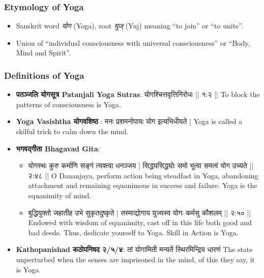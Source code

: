 \begin{frame}[fragile]\frametitle{Etymology of Yoga}

      \begin{itemize}
	
		\item Sanskrit word \textit{योग} (Yoga), root \textit{युज्} (Yuj) meaning “to join” or “to unite”.
		\item Union of ``individual consciousness with universal consciousness'' or ``Body, Mind and Spirit''.
	  \end{itemize}

\end{frame}

\begin{frame}[fragile]\frametitle{Definitions of Yoga}
      \begin{itemize}
        \item \textbf{पतञ्जलि  योगसूत्र  Patanjali Yoga Sutras}:      योगश्चित्तवृत्तिनिरोधः || १:२ || To block the patterns of consciousness is Yoga.
        \item \textbf{Yoga Vasishtha योगवशिष्ठ }:          मनः प्रशमनोपायः योग इत्यभिधीयते | Yoga is called a skilful trick to calm down the mind.
        \item \textbf{भगवद्गीता  Bhagavad Gita}:         
		      \begin{itemize}
				\item  योगस्थः कुरु कर्माणि सङ्गं त्यक्त्वा धनञ्जय |   सिद्ध्यसिद्ध्योः समो भूत्वा समत्वं योग उच्यते || २:४८ || O Dananjaya, perform action being steadfast in Yoga, abandoning attachment and remaining equanimous in success and failure. Yoga is the equanimity of mind.
				\item बुद्धियुक्तो जहातीह उभे सुकृतदुष्कृते |      तस्माद्योगाय युज्यस्व योगः कर्मसु कौशलम् || २:५० || Endowed with wisdom of equanimity, cast off in this life both good and bad deeds. Thus, dedicate yourself to Yoga. Skill in Action is Yoga.
				\end{itemize}
		\item \textbf{Kathopanishad कठोपनिषद २/५/४}: तां योगामिती मन्यतें स्थिरमिन्द्रिय धारणं The state unperturbed when the senses are imprisoned in the mind, of this they say, it is Yoga.
      \end{itemize}
\end{frame}

